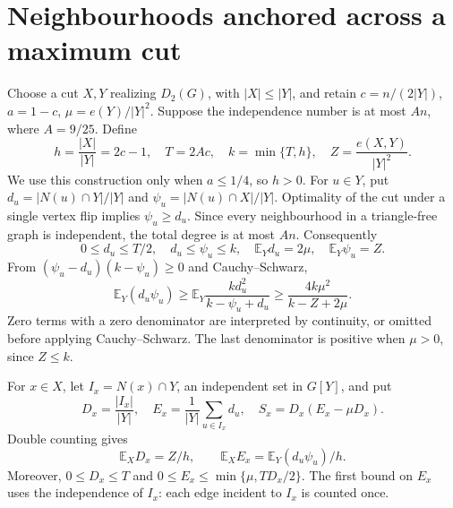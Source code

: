 \documentclass[12pt]{article}
\newcommand{\E}{\mathbb E}
\begin{document}
\section{Neighbourhoods anchored across a maximum cut}\label{sec:opposite}
Choose a cut $X,Y$ realizing $D_2(G)$, with $|X|\le|Y|$, and retain
$c=n/(2|Y|)$, $a=1-c$, $\mu=e(Y)/|Y|^2$. Suppose the independence
number is at most $An$, where $A=9/25$. Define
\[
 h=\frac{|X|}{|Y|}=2c-1,\quad T=2Ac,\quad k=\min\{T,h\},
 \quad Z=\frac{e(X,Y)}{|Y|^2}.
\]
We use this construction only when $a\le1/4$, so $h>0$.
For $u\in Y$, put $d_u=|N(u)\cap Y|/|Y|$ and
$\psi_u=|N(u)\cap X|/|Y|$. Optimality of the cut under a single
vertex flip implies $\psi_u\ge d_u$. Since every neighbourhood in a
triangle-free graph is independent, the total degree is at most $An$.
Consequently
\[
 0\le d_u\le T/2,\quad d_u\le\psi_u\le k,
 \quad\E_Yd_u=2\mu,\quad\E_Y\psi_u=Z.
\]
From $(\psi_u-d_u)(k-\psi_u)\ge0$ and Cauchy--Schwarz,
\begin{equation}\label{eq:product-moment}
 \E_Y(d_u\psi_u)\ge
 \E_Y\frac{k d_u^2}{k-\psi_u+d_u}
 \ge\frac{4k\mu^2}{k-Z+2\mu}.
\end{equation}
Zero terms with a zero denominator are interpreted by continuity, or
omitted before applying Cauchy--Schwarz. The last denominator is positive
when $\mu>0$, since $Z\le k$.

For $x\in X$, let $I_x=N(x)\cap Y$, an independent set in $G[Y]$,
and put
\[
 D_x=\frac{|I_x|}{|Y|},\quad
 E_x=\frac1{|Y|}\sum_{u\in I_x}d_u,
 \quad S_x=D_x(E_x-\mu D_x).
\]
Double counting gives
\[
 \E_XD_x=Z/h,\qquad
 \E_XE_x=\E_Y(d_u\psi_u)/h.
\]
Moreover, $0\le D_x\le T$ and
$0\le E_x\le\min\{\mu,TD_x/2\}$. The first bound on $E_x$ uses
the independence of $I_x$: each edge incident to $I_x$ is counted once.
\end{document}
